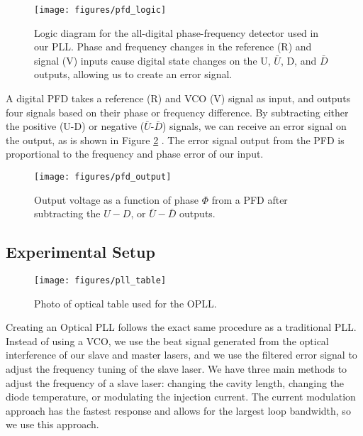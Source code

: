 \begin{figure}[!ht] 
 \centering 
 \texttt{[image: figures/pfd\_logic]} 
 \caption[Phase-frequency detector logic diagram]{Logic diagram for the all-digital phase-frequency detector used in our PLL.  Phase and frequency changes in the reference (R) and signal (V) inputs cause digital state changes on the U, $\bar{U}$, D, and $\bar{D}$ outputs, allowing us to create an error signal.} 
 \label{fig:pfd_logic} 
\end{figure}

A digital PFD takes a reference (R) and VCO (V) signal as input, and outputs four signals based on their phase or frequency difference.  By subtracting either the positive (U-D) or negative ($\bar{U}$-$\bar{D}$) signals, we can receive an error signal on the output, as is shown in Figure \ref{fig:pfd_output} \cite{mch12140}.  The error signal output from the PFD is proportional to the frequency and phase error of our input. 

\begin{figure}[!ht] 
 \centering 
 \texttt{[image: figures/pfd\_output]} 
 \caption[PFD output signal]{Output voltage as a function of phase $\Phi$ from a PFD after subtracting the $U-D$, or $\bar{U}-\bar{D}$ outputs.} 
 \label{fig:pfd_output} 
\end{figure}




\subsection{Experimental Setup} 

\begin{figure}[!ht] 
 \centering  
 \texttt{[image: figures/pll\_table]} 
 \caption[OPLL optical table photo]{Photo of optical table used for the OPLL.} 
 \label{fig:pll_table} 
\end{figure}


Creating an Optical PLL follows the exact same procedure as a traditional PLL.  Instead of using a VCO, we use the beat signal generated from the optical interference of our slave and master lasers, and we use the filtered error signal to adjust the frequency tuning of the slave laser.  We have three main methods to adjust the frequency of a slave laser:  changing the cavity length, changing the diode temperature, or modulating the injection current.  The current
 modulation approach has the fastest response and allows for the largest loop bandwidth, so we use this approach.


